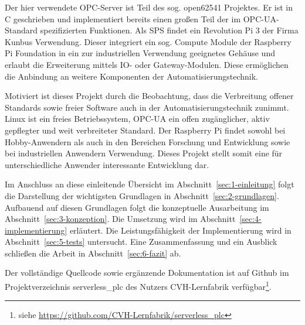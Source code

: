 Der hier verwendete OPC-Server ist Teil des sog. open62541 Projektes. Er ist in C
geschrieben und implementiert bereits einen großen Teil der im OPC-UA-Standard
spezifizierten Funktionen.
Als SPS findet ein Revolution Pi 3 der Firma Kunbus Verwendung. Dieser integriert
ein sog. Compute Module der Raspberry Pi Foundation in ein zur industriellen 
Verwendung geeignetes Gehäuse und erlaubt die Erweiterung mittels IO- oder Gateway-Modulen. 
Diese ermöglichen die Anbindung an weitere Komponenten der Automatisierungstechnik.

Motiviert ist dieses Projekt durch die Beobachtung, dass die Verbreitung offener
Standards sowie freier Software auch in der Automatisierungstechnik zunimmt.
Linux ist ein freies Betriebssystem, OPC-UA ein offen zugänglicher, aktiv gepflegter
und weit verbreiteter Standard. Der Raspberry Pi findet sowohl bei Hobby-Anwendern als
auch in den Bereichen Forschung und Entwicklung sowie bei industriellen Anwendern
Verwendung. Dieses Projekt stellt somit eine für unterschiedliche Anwender interessante
Entwicklung dar.

Im Anschluss an diese einleitende Übersicht im Abschnitt~\ref{sec:1-einleitung} folgt
die Darstellung der wichtigsten Grundlagen in Abschnitt~\ref{sec:2-grundlagen}.
Aufbauend auf diesen Grundlagen folgt die konzeptuelle Ausarbeitung im Abschnitt~\ref{sec:3-konzeption}.
Die Umsetzung wird im Abschnitt~\ref{sec:4-implementierung} erläutert.
Die Leistungsfähigkeit der Implementierung wird in Abschnitt~\ref{sec:5-tests} untersucht.
Eine Zusammenfassung und ein Ausblick schließen die Arbeit in
Abschnitt~\ref{sec:6-fazit} ab.

Der vollständige Quellcode sowie ergänzende Dokumentation ist auf Github im Projektverzeichnis serverless\_plc des Nutzers CVH-Lernfabrik verfügbar\footnote{siehe \url{ https://github.com/CVH-Lernfabrik/serverless_plc}}.
